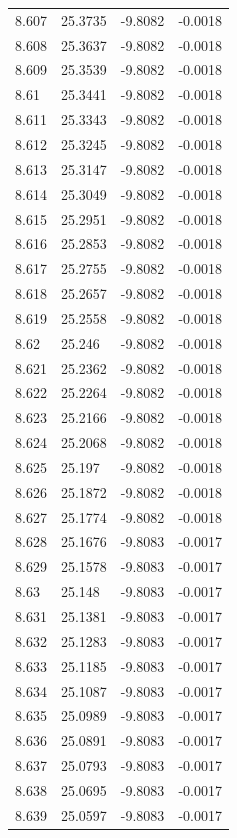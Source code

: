 \begin{tabular}{llll}
8.607 & 25.3735 & -9.8082 & -0.0018 \\
8.608 & 25.3637 & -9.8082 & -0.0018 \\
8.609 & 25.3539 & -9.8082 & -0.0018 \\
8.61 & 25.3441 & -9.8082 & -0.0018 \\
8.611 & 25.3343 & -9.8082 & -0.0018 \\
8.612 & 25.3245 & -9.8082 & -0.0018 \\
8.613 & 25.3147 & -9.8082 & -0.0018 \\
8.614 & 25.3049 & -9.8082 & -0.0018 \\
8.615 & 25.2951 & -9.8082 & -0.0018 \\
8.616 & 25.2853 & -9.8082 & -0.0018 \\
8.617 & 25.2755 & -9.8082 & -0.0018 \\
8.618 & 25.2657 & -9.8082 & -0.0018 \\
8.619 & 25.2558 & -9.8082 & -0.0018 \\
8.62 & 25.246 & -9.8082 & -0.0018 \\
8.621 & 25.2362 & -9.8082 & -0.0018 \\
8.622 & 25.2264 & -9.8082 & -0.0018 \\
8.623 & 25.2166 & -9.8082 & -0.0018 \\
8.624 & 25.2068 & -9.8082 & -0.0018 \\
8.625 & 25.197 & -9.8082 & -0.0018 \\
8.626 & 25.1872 & -9.8082 & -0.0018 \\
8.627 & 25.1774 & -9.8082 & -0.0018 \\
8.628 & 25.1676 & -9.8083 & -0.0017 \\
8.629 & 25.1578 & -9.8083 & -0.0017 \\
8.63 & 25.148 & -9.8083 & -0.0017 \\
8.631 & 25.1381 & -9.8083 & -0.0017 \\
8.632 & 25.1283 & -9.8083 & -0.0017 \\
8.633 & 25.1185 & -9.8083 & -0.0017 \\
8.634 & 25.1087 & -9.8083 & -0.0017 \\
8.635 & 25.0989 & -9.8083 & -0.0017 \\
8.636 & 25.0891 & -9.8083 & -0.0017 \\
8.637 & 25.0793 & -9.8083 & -0.0017 \\
8.638 & 25.0695 & -9.8083 & -0.0017 \\
8.639 & 25.0597 & -9.8083 & -0.0017 \\

\end{tabular}
